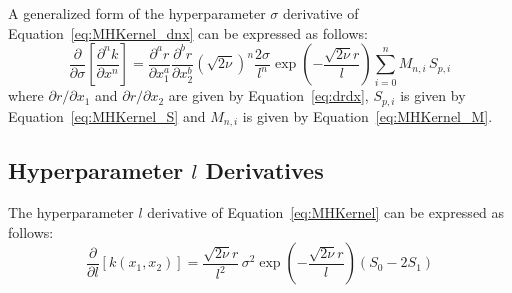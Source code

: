 \documentclass{article}
\begin{document}
\begin{comment}
\begin{equation}
\label{eq:MHKernel_ds_d1x}
	\begin{gathered}
	\frac{\partial}{\partial \sigma} \left[\frac{\partial k\!\left(x_1,x_2\right)}{\partial x_1}\right] = - \frac{\partial r}{\partial x_1} \frac{\sqrt{2 \nu}}{l} \, 2 \sigma \exp{\left(-\frac{\sqrt{2 \nu} r}{l}\right)} \left(S_0 - 2 S_1\right) \\
	\frac{\partial}{\partial \sigma} \left[\frac{\partial k\!\left(x_1,x_2\right)}{\partial x_2}\right] = - \frac{\partial r}{\partial x_2} \frac{\sqrt{2 \nu}}{l} \, 2 \sigma \exp{\left(-\frac{\sqrt{2 \nu} r}{l}\right)} \left(S_0 - 2 S_1\right)
	\end{gathered}
\end{equation}

\begin{equation}
\label{eq:MHKernel_ds_d2x}
	\frac{\partial}{\partial \sigma} \left[\frac{\partial^2 k\!\left(x_1,x_2\right)}{\partial x_1 \partial x_2}\right] = \frac{\partial r}{\partial x_1} \frac{\partial r}{\partial x_2} \frac{2 \nu}{l^2} \, 2 \sigma \exp{\left(-\frac{\sqrt{2 \nu} r}{l}\right)} \left(S_0 - 4 S_1 + 4 S_2\right)
\end{equation}
\end{comment}

A generalized form of the hyperparameter $\sigma$ derivative of Equation~\eqref{eq:MHKernel_dnx} can be expressed as follows:
\begin{equation}
\label{eq:MHKernel_ds_dnx}
	\frac{\partial}{\partial \sigma} \left[\frac{\partial^n k}{\partial x^n}\right] = \frac{\partial^a r}{\partial x_1^a} \frac{\partial^b r}{\partial x_2^b} \left(\sqrt{2 \nu}\right)^n \frac{2 \sigma}{l^n} \exp{\left(-\frac{\sqrt{2 \nu} r}{l}\right)} \sum_{i=0}^{n} M_{n,i} \, S_{p,i}
\end{equation}
where $\partial r/\partial x_1$ and $\partial r/\partial x_2$ are given by Equation~\eqref{eq:drdx}, $S_{p,i}$ is given by Equation~\eqref{eq:MHKernel_S} and $M_{n,i}$ is given by Equation~\eqref{eq:MHKernel_M}.

\subsection{Hyperparameter $l$ Derivatives}
\label{subsec:MHHypDer_l}

The hyperparameter $l$ derivative of Equation~\eqref{eq:MHKernel} can be expressed as follows:
\begin{equation}
\label{eq:MHKernel_dl}
	\frac{\partial}{\partial l} \left[k\!\left(x_1,x_2\right)\right] = \frac{\sqrt{2 \nu} r}{l^2} \, \sigma^2 \exp{\left(-\frac{\sqrt{2 \nu} r}{l}\right)} \left(S_0 - 2 S_1\right)
\end{equation}
\end{document}
